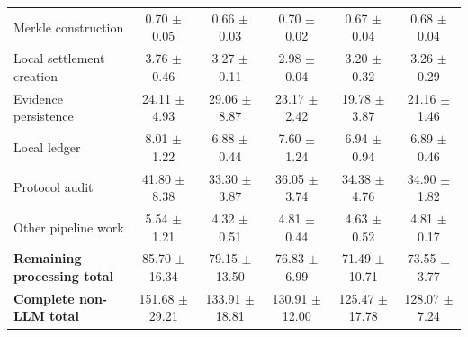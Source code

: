 \begin{table}[!t]
\begin{tabular*}{\textwidth}{@{\hspace{4pt}}l@{\extracolsep{\fill}}ccccc@{\hspace{4pt}}}
Merkle construction & 0.70 $\pm$ 0.05 & 0.66 $\pm$ 0.03 & 0.70 $\pm$ 0.02 & 0.67 $\pm$ 0.04 & 0.68 $\pm$ 0.04 \\
Local settlement creation & 3.76 $\pm$ 0.46 & 3.27 $\pm$ 0.11 & 2.98 $\pm$ 0.04 & 3.20 $\pm$ 0.32 & 3.26 $\pm$ 0.29 \\
Evidence persistence & 24.11 $\pm$ 4.93 & 29.06 $\pm$ 8.87 & 23.17 $\pm$ 2.42 & 19.78 $\pm$ 3.87 & 21.16 $\pm$ 1.46 \\
Local ledger & 8.01 $\pm$ 1.22 & 6.88 $\pm$ 0.44 & 7.60 $\pm$ 1.24 & 6.94 $\pm$ 0.94 & 6.89 $\pm$ 0.46 \\
Protocol audit & 41.80 $\pm$ 8.38 & 33.30 $\pm$ 3.87 & 36.05 $\pm$ 3.74 & 34.38 $\pm$ 4.76 & 34.90 $\pm$ 1.82 \\
Other pipeline work & 5.54 $\pm$ 1.21 & 4.32 $\pm$ 0.51 & 4.81 $\pm$ 0.44 & 4.63 $\pm$ 0.52 & 4.81 $\pm$ 0.17 \\
\textbf{Remaining processing total} & 85.70 $\pm$ 16.34 & 79.15 $\pm$ 13.50 & 76.83 $\pm$ 6.99 & 71.49 $\pm$ 10.71 & 73.55 $\pm$ 3.77 \\
\midrule
\textbf{Complete non-LLM total} & 151.68 $\pm$ 29.21 & 133.91 $\pm$ 18.81 & 130.91 $\pm$ 12.00 & 125.47 $\pm$ 17.78 & 128.07 $\pm$ 7.24 \\
\bottomrule
\end{tabular*}
\end{table}
